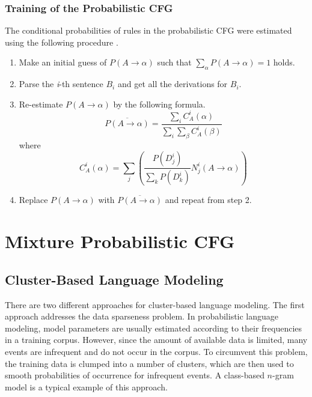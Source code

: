 \subsubsection*{Training of the Probabilistic CFG}

The conditional probabilities of rules in the probabilistic CFG
were estimated using the following procedure \cite{Fujisaki91}.

\begin{enumerate}
\item	Make an initial guess of $P(A \rightarrow \alpha)$
	such that $\sum_{\alpha} P(A \rightarrow \alpha) = 1$ holds.
\item	Parse the {\em i}-th sentence $B_{i}$ and get all the derivations for $B_{i}$.
\item	Re-estimate $P(A \rightarrow \alpha)$ by the following formula.
\begin{equation}
      \overline{P(A \rightarrow \alpha)} = \frac{\sum_{i} C_{A}^{i}(\alpha)}
      {\sum_{i} \sum_{\beta} C_{A}^{i}(\beta)}
\end{equation}
      where
\begin{equation}
      C_{A}^{i}(\alpha) = \sum_{j}
      \left( \frac{P(D_{j}^{i})}{\sum_{k} P(D_{k}^{i})} N_{j}^{i}(A \rightarrow \alpha) \right)
\end{equation}
\item	Replace $P(A \rightarrow \alpha)$ with $\overline{P(A \rightarrow \alpha)}$ and repeat from step 2.
\end{enumerate}


\section{Mixture Probabilistic CFG}

\subsection{Cluster-Based Language Modeling}

There are two different approaches for cluster-based language modeling.
The first approach addresses the data sparseness problem.
In probabilistic language modeling,
model parameters are usually estimated according to
their frequencies in a training corpus.
However, since the amount of available data is limited,
many events are infrequent and do not occur in the corpus.
To circumvent this problem,
the training data is clumped into a number of clusters,
which are then used to smooth probabilities
of occurrence for infrequent events.
A class-based $n$-gram model \cite{Brown92}
is a typical example of this approach.

